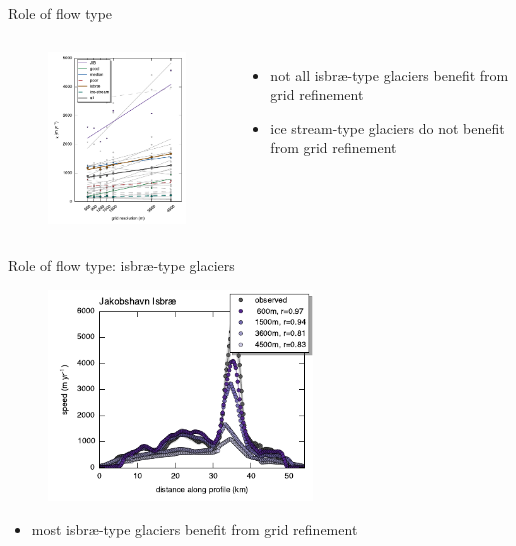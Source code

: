 \documentclass[hide notes,intlimits]{beamer}
\begin{document}
{
%
} 


\begin{frame}{Role of flow type}
  \begin{columns}
    \column[c]{5.5cm}
    \begin{figure}
      \includegraphics[width=5.5cm]{rmsd_regression_velsurf_normal_250m_grid_mo14_flow_combined}
    \end{figure}
    \column[c]{6.5cm}
    \begin{itemize}
      \item not all isbr{\ae}-type glaciers benefit from grid refinement
      \item ice stream-type glaciers do not benefit from grid refinement
    \end{itemize}
  \end{columns}
\end{frame}


\begin{frame}{Role of flow type: isbr{\ae}-type glaciers}
    \begin{figure}
      \includegraphics[width=7cm]{Jakobshavn_Isbrae_velsurf_normal_profile_250m_greenland_2008-2009_grid_mo14_flow_sel_purple}
    \end{figure}
    \begin{itemize}
      \item most isbr{\ae}-type glaciers benefit from grid refinement
    \end{itemize}
\end{frame}
\end{document}
